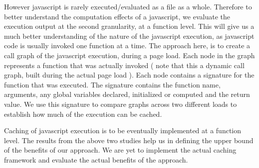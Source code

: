 However javascript is rarely executed/evaluated as a file as a whole. Therefore to better understand the computation
effects of a javascript, we evaluate the execution output at the second granularity, at a function level. 
This will give us a much better understanding of the nature of the javascript execution, as javascript code is usually
invoked one function at a time. 
The approach here, is to create a call graph of the javascript execution, during a page load. Each node
in the graph represents a function that was actually invoked ( note that this a dynamic call graph, built
during the actual page load ). Each node contains a signature for the function that was executed. 
The signature contains the function name, arguments, any global variables declared, initialized or computed
and the return value. We use this signature to compare graphs across two different loads to 
establish how much of the execution can be cached. 


Caching of javascript execution is to be eventually implemented at a function level. The results from the above two studies
help us in defining the upper bound of the benefits of our approach. 
We are yet to implement the actual caching framework and evaluate the actual benefits of the approach.
